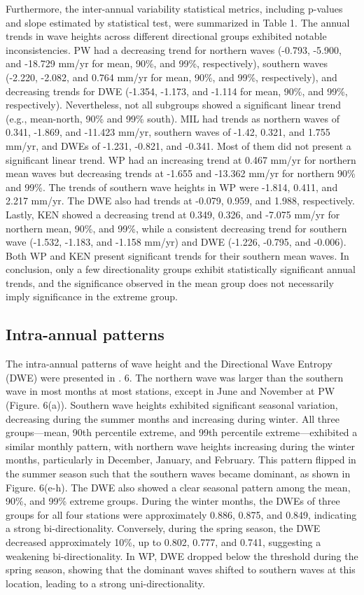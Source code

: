 Furthermore, the inter-annual variability statistical metrics, including p-values and slope estimated by statistical test, were summarized in Table 1. The annual trends in wave heights across different directional groups exhibited notable inconsistencies. PW had a decreasing trend for northern waves (-0.793, -5.900, and -18.729 mm/yr for mean, 90\%, and 99\%, respectively), southern waves (-2.220, -2.082, and 0.764 mm/yr for mean, 90\%, and 99\%, respectively), and decreasing trends for DWE (-1.354, -1.173, and -1.114 for mean, 90\%, and 99\%, respectively). Nevertheless, not all subgroups showed a significant linear trend (e.g., mean-north, 90\% and 99\% south). MIL had trends as northern waves of 0.341, -1.869, and -11.423 mm/yr, southern waves of -1.42, 0.321, and 1.755 mm/yr, and DWEs of -1.231, -0.821, and -0.341. Most of them did not present a significant linear trend. WP had an increasing trend at 0.467 mm/yr for northern mean waves but decreasing trends at -1.655 and -13.362 mm/yr for northern 90\% and 99\%. The trends of southern wave heights in WP were -1.814, 0.411, and 2.217 mm/yr. The DWE also had trends at -0.079, 0.959, and 1.988, respectively. Lastly, KEN showed a decreasing trend at 0.349, 0.326, and -7.075 mm/yr for northern mean, 90\%, and 99\%, while a consistent decreasing trend for southern wave (-1.532, -1.183, and -1.158 mm/yr) and DWE (-1.226, -0.795, and -0.006). Both WP and KEN present significant trends for their southern mean waves. In conclusion, only a few directionality groups exhibit statistically significant annual trends, and the significance observed in the mean group does not necessarily imply significance in the extreme group.



\subsection{Intra-annual patterns}
\label{Intra-annual patterns}
The intra-annual patterns of wave height and the Directional Wave Entropy (DWE) were presented in . 6. The northern wave was larger than the southern wave in most months at most stations, except in June and November at PW (Figure. 6(a)). Southern wave heights exhibited significant seasonal variation, decreasing during the summer months and increasing during winter. All three groups—mean, 90th percentile extreme, and 99th percentile extreme—exhibited a similar monthly pattern, with northern wave heights increasing during the winter months, particularly in December, January, and February. This pattern flipped in the summer season such that the southern waves became dominant, as shown in Figure. 6(e-h). The DWE also showed a clear seasonal pattern among the mean, 90\%, and 99\% extreme groups. During the winter months, the DWEs of three groups for all four stations were approximately 0.886, 0.875, and 0.849, indicating a strong bi-directionality. Conversely, during the spring season, the DWE decreased approximately 10\%, up to 0.802, 0.777, and 0.741, suggesting a weakening bi-directionality. In WP, DWE dropped below the threshold during the spring season, showing that the dominant waves shifted to southern waves at this location, leading to a strong uni-directionality.  

